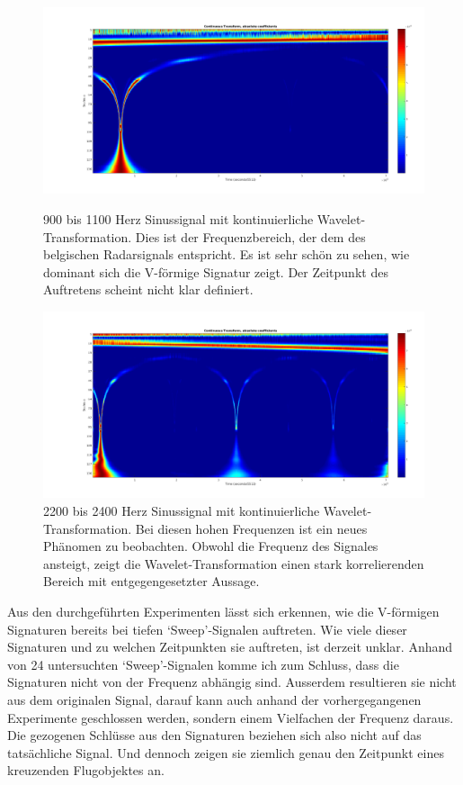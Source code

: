 \begin{refsection}
\begin{figure}[h]
	\centering
	\includegraphics[width=0.9\linewidth]{papers/meteor/images/anomalie/sweep/cwt_0900to1100hz.png}
	\caption{900 bis 1100 Herz Sinussignal mit kontinuierliche Wavelet-Transformation.
	Dies ist der Frequenzbereich, der dem des belgischen Radarsignals entspricht.
	Es ist sehr schön zu sehen, wie dominant sich die V-förmige Signatur zeigt.
	Der Zeitpunkt des Auftretens scheint nicht klar definiert.}
	\includegraphics[width=0.9\linewidth]{papers/meteor/images/anomalie/sweep/cwt_2200to2400hz.png}
	\caption{2200 bis 2400 Herz Sinussignal mit kontinuierliche Wavelet-Transformation.
	Bei diesen hohen Frequenzen ist ein neues Phänomen zu beobachten.
	Obwohl die Frequenz des Signales ansteigt, zeigt die Wavelet-Transformation einen stark korrelierenden Bereich mit entgegengesetzter Aussage.}
	\label{fig:cwt_anomalie_beam_2}
\end{figure}
Aus den durchgeführten Experimenten lässt sich erkennen, wie die V-förmigen Signaturen bereits bei tiefen `Sweep'-Signalen auftreten.
Wie viele dieser Signaturen und zu welchen Zeitpunkten sie auftreten, ist derzeit unklar.
Anhand von 24 untersuchten `Sweep'-Signalen komme ich zum Schluss, dass die Signaturen nicht von der Frequenz abhängig sind.
Ausserdem resultieren sie nicht aus dem originalen Signal, darauf kann auch anhand der vorhergegangenen Experimente geschlossen werden, sondern einem Vielfachen der Frequenz daraus. 
Die gezogenen Schlüsse aus den Signaturen beziehen sich also nicht auf das tatsächliche Signal.
Und dennoch zeigen sie ziemlich genau den Zeitpunkt eines kreuzenden Flugobjektes an.


\end{refsection}
